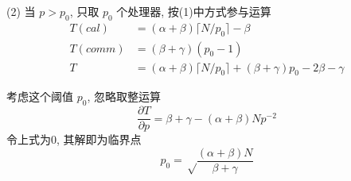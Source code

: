 \documentclass[a4paper, UTF8]{ctexart}				%
\numberwithin{equation}{section}				%
\begin{document}
        (2) 当 $p > p_0$, 只取 $p_0$ 个处理器, 按(1)中方式参与运算 
        \[
            \begin{split}
                T(cal)     &= (\alpha + \beta) \lceil N/p_0 \rceil - \beta\\
                T(comm)    &= (\beta + \gamma)(p_0 - 1)\\
                T          &= (\alpha + \beta) \lceil N/p_0 \rceil  + (\beta + \gamma)p_0 - 2\beta - \gamma
        \end{split}  
        \]

        考虑这个阈值 $p_0$, 忽略取整运算
        \[
            \frac{\partial T}{\partial p} = \beta + \gamma - (\alpha + \beta) N p^{-2}
        \]
        令上式为0, 其解即为临界点 $$p_0 = \sqrt \frac{(\alpha + \beta) N}{\beta + \gamma}$$
\end{document}
